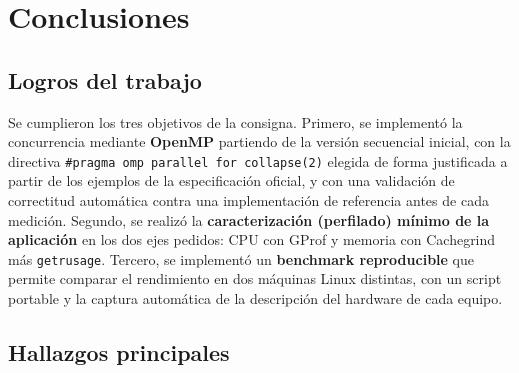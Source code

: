 \section{Conclusiones}

\subsection{Logros del trabajo}

Se cumplieron los tres objetivos de la consigna. Primero, se implementó la concurrencia mediante \textbf{OpenMP} partiendo de la versión secuencial inicial, con la directiva \texttt{\#pragma omp parallel for collapse(2)} elegida de forma justificada a partir de los ejemplos de la especificación oficial, y con una validación de correctitud automática contra una implementación de referencia antes de cada medición. Segundo, se realizó la \textbf{caracterización (perfilado) mínimo de la aplicación} en los dos ejes pedidos: CPU con GProf y memoria con Cachegrind más \texttt{getrusage}. Tercero, se implementó un \textbf{benchmark reproducible} que permite comparar el rendimiento en dos máquinas Linux distintas, con un script portable y la captura automática de la descripción del hardware de cada equipo.

\subsection{Hallazgos principales}

